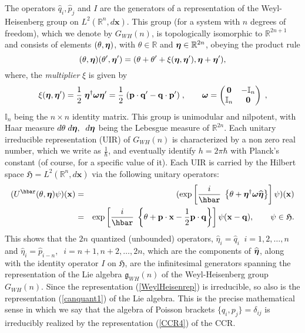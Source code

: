 \documentclass[11pt]{amsart}
\numberwithin{equation}{section}
\theoremstyle{remark}
\newcommand\HH{\mathfrak H}
\newcommand{\be}{\begin{equation}}
\newcommand{\en}{\end{equation}}
\newcommand{\bea}{\begin{eqnarray}}
\newcommand{\ena}{\end{eqnarray}}
\newcommand{\bomega}{\mbox{\boldmath $\omega$}}
\newcommand{\bfeta}{\mbox{\boldmath $\eta$}}
\newcommand{\bp}{\mathbf p}
\newcommand{\bq}{\mathbf q}
\newcommand{\bx}{\mathbf x}
\begin{document}
The operators $\widehat{q}_{i}, \widehat{p}_{j}$ and $I$ are the
generators of a representation of the Weyl-Heisenberg group on
$L^{2}({\mathbb R}^{n}, d\bx)$. This group (for a system with $n$ degrees of
freedom), which we denote by $G_{WH}(n)$, is topologically isomorphic to
${\mathbb R}^{2n+1}$ and consists of elements $(\theta , \bfeta )$, with
$\theta \in \mathbb R$ and $\bfeta \in {\mathbb R}^{2n}$, obeying the product
rule
\be
   (\theta , \bfeta )(\theta' , \bfeta' ) = (\theta + \theta'
   + \xi (\bfeta , \bfeta' ), \bfeta + \bfeta' ),
\label{WeylHeisenprod}
\en
where, the  {\em multiplier} $\xi$ is given by
\be
 \xi(\bfeta , \bfeta' ) = \frac 12\; \bfeta^{\dagger}\bomega\bfeta'
      = \frac 12\; (\bp\cdot\bq' - \bq\cdot\bp' )\; , \qquad
      \bomega = \begin{pmatrix} \mathbf 0 & -\mathbb I_n\\
      \mathbb I_n & \mathbf 0\end{pmatrix}\; ,
\label{multiplier}
\en
${\mathbb I}_n$ being the $n\times n$ identity matrix. This group is unimodular
and  nilpotent, with Haar measure $d\theta \; d{\bfeta}, \;\; d{\bfeta}$ being
the Lebesgue measure of ${\mathbb R}^{2n}$. Each unitary irreducible
representation (UIR) of $G_{WH}(n)$ is characterized by a non zero real number,
which we write as $\displaystyle{\frac 1\hbar}$, and eventually identify
$h = 2\pi\hbar$ with Planck's constant (of course, for a specific value of it).
Each UIR is carried by the Hilbert space $\HH =L^{2}({\mathbb R}^{n}, d\bx )$
via the following unitary operators:
\bea
  (U^{\hbar}(\theta , \bfeta )\psi )(\bx )&  = &
   (\exp \left[\frac i\hbar\;\left\{\theta + {\bfeta}^{\dagger}
  \bomega\widehat{\bfeta}\right\}\right]\psi )(\bx )
   \nonumber\\
     & = & \exp \left[\frac i\hbar\;\left\{\theta + \bp\cdot\bx -\frac 12
      \bp\cdot\bq \right\}\right]\psi (\bx -\bq ), \qquad
  \psi \in \HH .
\label{WeylHeisenrep}
\ena
This shows that the $2n$ quantized (unbounded)
operators, $\widehat{\eta}_i = \widehat{q}_i\;\;
i=1,2, \ldots , n$ and $\widehat{\eta}_i = \widehat{p}_{i-n},\;\;
i=n+1, n+2, \ldots , 2n$, which are the components of $\widehat{\bfeta}$,
along with the identity operator $I$ on $\HH$, are
the infinitesimal generators spanning the representation of the Lie algebra
${\mathfrak g}_{WH}(n)$ of the Weyl-Heisenberg group $G_{WH}(n)$. Since the
representation (\ref{WeylHeisenrep}) is irreducible, so also is the
representation (\ref{canquant1}) of the Lie algebra. This is the precise
mathematical sense in which we say that the algebra of Poisson brackets
$\{q_i, p_{j}\} = \delta_{ij}$ is irreducibly realized by the representation
(\ref{CCR4}) of the CCR.
\end{document}
